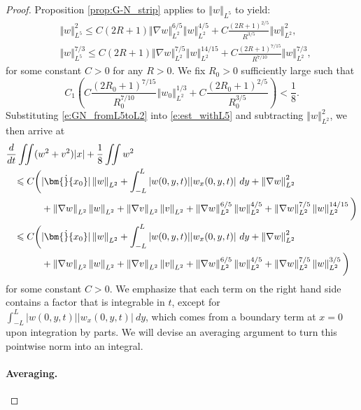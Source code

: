 \documentclass[final,11pt]{article}
\renewcommand{\leq}{\leqslant}
\theoremstyle{definition} %
\newcommand{\lv}{\left\Vert}
\newcommand{\rv}{\right\Vert}
\theoremstyle{plain}
\theoremstyle{definition} %
\theoremstyle{remark}
\begin{document}
\begin{proof}
Proposition \ref{prop:G-N_strip} applies to $\lv w\rv_{L^5}$ to yield: 
\begin{equation}\label{e:GN_fromL5toL2}
\begin{split}
&\Vert w \Vert_{L^5}^2 \leq C(2R+1)\Vert \nabla  w \Vert_{L^2}^{6/5}\lv w\rv_{L^2}^{4/5} + C\frac{(2R+1)^{2/5}}{R^{3/5}} \Vert  w \Vert_{L^2}^2,
\\
&\Vert w \Vert_{L^5}^{7/3} \leq C(2R+1)\Vert \nabla  w \Vert_{L^2}^{7/5}\lv w\rv_{L^2}^{14/15} + C\frac{(2R+1)^{7/15}}{R^{7/10}} \Vert  w \Vert_{L^2}^{7/3},
\end{split}
\end{equation}
for some constant $C>0$ for any $R > 0$. We fix $R_0 > 0$  sufficiently large such that 
\[ 
C_1\left(C\frac{(2R_0+1)^{7/15}}{R_0^{7/10}}\lv w_0 \rv_{L^2}^{1/3} + C\frac{(2R_0+1)^{2/5}}{R_0^{3/5}}\right) < \frac{1}{8}.
\] 
Substituting \eqref{e:GN_fromL5toL2} into \eqref{e:est_withL5} and  subtracting $\lv w \rv_{L^2}^2$, we then arrive at
\begin{align*}
\frac{d}{dt}&\iint (w^2 + v^2)|x|+ \frac{1}{8}\iint w^2 \\
&\begin{aligned}\leq C\bigg( &|\bm{\dot}{x_0}|\lv w\rv_{L^2} + \int_{-L}^L|w(0,y,t)||w_x(0,y,t)|~dy + \lv \nabla w \rv_{L^2}^2\\
& + \lv \nabla w \rv_{L^2}\lv w \rv_{L^2} + \lv \nabla v \rv_{L^2} \lv v\rv_{L^2} +  \Vert \nabla  w \Vert_{L^2}^{6/5}\lv w\rv_{L^2}^{4/5} +  \Vert \nabla  w \Vert_{L^2}^{7/5}\lv w\rv_{L^2}^{14/15}\bigg)\end{aligned} \\
&\begin{aligned}\leq C\bigg(& |\bm{\dot}{x_0}|\lv w\rv_{L^2} + \int_{-L}^L|w(0,y,t)||w_x(0,y,t)|~dy + \lv \nabla w \rv_{L^2}^2\\
&+ \lv \nabla w \rv_{L^2}\lv w \rv_{L^2} + \lv \nabla v \rv_{L^2} \lv v\rv_{L^2} +  \Vert \nabla  w \Vert_{L^2}^{6/5}\lv w\rv_{L^2}^{4/5} +  \Vert \nabla  w \Vert_{L^2}^{7/5}\lv w\rv_{L^2}^{3/5}\bigg)\end{aligned} 
\end{align*}
for some constant $C>0$.
We emphasize that each term on the right hand side contains a factor that is integrable in $t$, except for $\displaystyle \int_{-L}^L|w(0,y,t)||w_x(0,y,t)|~dy$, which comes from a boundary term at $x=0$ upon integration by parts. We will devise an averaging argument to turn this pointwise norm into an integral.

\paragraph{Averaging.} 


\end{proof}
\end{document}
